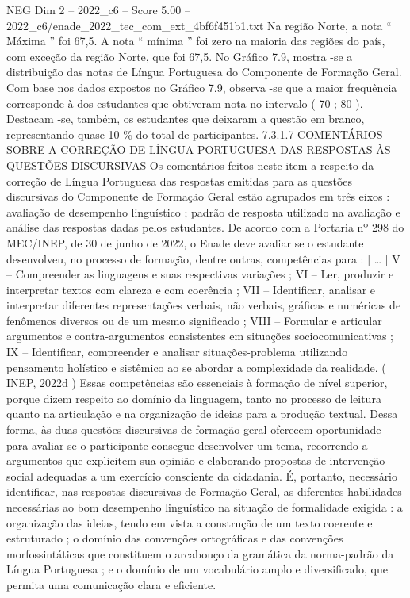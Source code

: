 \begin{textsample}{NEG Dim 2 – 2022\_c6 – Score 5.00 – 2022\_c6/enade\_2022\_tec\_com\_ext\_4bf6f451b1.txt}
Na região Norte, a nota “ Máxima ” foi 67,5.
A nota “ mínima ” foi zero na maioria das regiões do país, com exceção da região Norte, que foi 67,5.
No Gráfico 7.9, mostra -se a distribuição das notas de Língua Portuguesa do Componente de Formação Geral.
Com base nos dados expostos no Gráfico 7.9, observa -se que a maior frequência corresponde à dos estudantes que obtiveram nota no intervalo ( 70 ; 80 ).
Destacam -se, também, os estudantes que deixaram a questão em branco, representando quase 10 \% do total de participantes. 7.3.1.7 COMENTÁRIOS SOBRE A CORREÇÃO DE LÍNGUA PORTUGUESA DAS RESPOSTAS ÀS QUESTÕES DISCURSIVAS Os comentários feitos neste item a respeito da correção de Língua Portuguesa das respostas emitidas para as questões discursivas do Componente de Formação Geral estão agrupados em três eixos : avaliação de desempenho linguístico ; padrão de resposta utilizado na avaliação e análise das respostas dadas pelos estudantes.
De acordo com a Portaria nº 298 do MEC/INEP, de 30 de junho de 2022, o Enade deve avaliar se o estudante desenvolveu, no processo de formação, dentre outras, competências para : [ … ] V – Compreender as linguagens e suas respectivas variações ; VI – Ler, produzir e interpretar textos com clareza e com coerência ; VII – Identificar, analisar e interpretar diferentes representações verbais, não verbais, gráficas e numéricas de fenômenos diversos ou de um mesmo significado ; VIII – Formular e articular argumentos e contra-argumentos consistentes em situações sociocomunicativas ; IX – Identificar, compreender e analisar situações-problema utilizando pensamento holístico e sistêmico ao se abordar a complexidade da realidade. ( INEP, 2022d ) Essas competências são essenciais à formação de nível superior, porque dizem respeito ao domínio da linguagem, tanto no processo de leitura quanto na articulação e na organização de ideias para a produção textual.
Dessa forma, às duas questões discursivas de formação geral oferecem oportunidade para avaliar se o participante consegue desenvolver um tema, recorrendo a argumentos que explicitem sua opinião e elaborando propostas de intervenção social adequadas a um exercício consciente da cidadania.
É, portanto, necessário identificar, nas respostas discursivas de Formação Geral, as diferentes habilidades necessárias ao bom desempenho linguístico na situação de formalidade exigida : a organização das ideias, tendo em vista a construção de um texto coerente e estruturado ; o domínio das convenções ortográficas e das convenções morfossintáticas que constituem o arcabouço da gramática da norma-padrão da Língua Portuguesa ; e o domínio de um vocabulário amplo e diversificado, que permita uma comunicação clara e eficiente.

\end{textsample}
